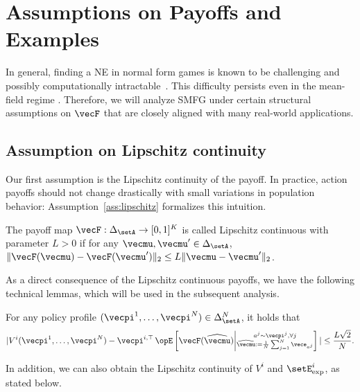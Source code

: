 



\section{Assumptions on Payoffs and Examples}\label{sec:assumptions_examples}


In general, finding a NE in normal form games is known to 
be challenging and possibly computationally intractable~\citep{papadimitriou1994complexity, daskalakis2009complexity}. This difficulty persists even in the mean-field regime \citep{yardim2024mean}.
Therefore, we will analyze SMFG under certain structural assumptions on $\vecF$ that are closely aligned with many real-world applications.

\subsection{Assumption on Lipschitz continuity}
Our first assumption is the Lipschitz continuity of the payoff.
In practice, action payoffs should not change drastically with small variations in population behavior: Assumption~\ref{ass:lipschitz} formalizes this intuition.

\begin{assumption}\label{ass:lipschitz}
The payoff map $\vecF: \Delta_\setA \rightarrow [0,1]^K$ is called Lipschitz continuous with parameter $L > 0$ if for any $\vecmu, \vecmu' \in \Delta_\setA$, $\| \vecF(\vecmu) - \vecF(\vecmu')\|_2 \leq L \| \vecmu - \vecmu' \|_2$.
\end{assumption}

As a direct consequence of the Lipschitz continuous payoffs, we have the following technical lemmas, which will be used in the subsequent analysis. 
\begin{lemma}\label{lemma:technical_bound_1N}
For any policy profile $(\vecpi^1, \ldots, \vecpi^N) \in \Delta_\setA^N$, it holds that
 \begin{align*}
| V^i(\vecpi^1, \ldots, \vecpi^N) - \vecpi^{i, \top} \Exop \left[ \vecF(\widehat{\vecmu}) \middle| \substack{
a^j \sim \vecpi^j, \forall j \\
\widehat{\vecmu} := \frac{1}{N} \sum_{j=1}^N \vece_{a^j}} \right] | 
\leq 
\frac{L\sqrt{2}}{N}.
 \end{align*}
\end{lemma}

In addition, we can also obtain the Lipschitz continuity of $V^i$ and $\setE^i_{\text{exp}}$, as stated below. 

